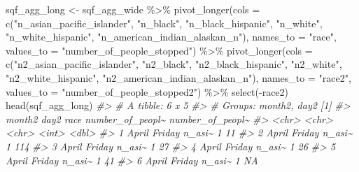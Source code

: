 \documentclass[
]{krantz}
\makeatletter
\newenvironment{Shaded}{\begin{snugshade}}{\end{snugshade}}
\newcommand{\AttributeTok}[1]{\textcolor[rgb]{0.61,0.61,0.61}{#1}}
\newcommand{\CommentTok}[1]{\textcolor[rgb]{0.37,0.37,0.37}{\textit{#1}}}
\newcommand{\FunctionTok}[1]{\textcolor[rgb]{0,0,0}{#1}}
\newcommand{\NormalTok}[1]{#1}
\newcommand{\OtherTok}[1]{\textcolor[rgb]{0.37,0.37,0.37}{#1}}
\newcommand{\SpecialCharTok}[1]{\textcolor[rgb]{0,0,0}{#1}}
\newcommand{\StringTok}[1]{\textcolor[rgb]{0.5,0.5,0.5}{#1}}
\newenvironment{kframe}{%
\medskip{}
\setlength{\fboxsep}{.8em}
 \def\at@end@of@kframe{}%
 \ifinner\ifhmode%
  \def\at@end@of@kframe{\end{minipage}}%
  \begin{minipage}{\columnwidth}%
 \fi\fi%
 \def\FrameCommand##1{\hskip\@totalleftmargin \hskip-\fboxsep
 \colorbox{shadecolor}{##1}\hskip-\fboxsep
     \hskip-\linewidth \hskip-\@totalleftmargin \hskip\columnwidth}%
 \MakeFramed {\advance\hsize-\width
   \@totalleftmargin\z@ \linewidth\hsize
   \@setminipage}}%
 {\par\unskip\endMakeFramed%
 \at@end@of@kframe}
\renewenvironment{Shaded}{\begin{kframe}}{\end{kframe}}
\makeatother
\begin{document}
\begin{Shaded}
\begin{Highlighting}[]
\NormalTok{sqf\_agg\_long }\OtherTok{\textless{}{-}}\NormalTok{ sqf\_agg\_wide }\SpecialCharTok{\%\textgreater{}\%}
  \FunctionTok{pivot\_longer}\NormalTok{(}\AttributeTok{cols =} \FunctionTok{c}\NormalTok{(}\StringTok{"n\_asian\_pacific\_islander"}\NormalTok{, }
                        \StringTok{"n\_black"}\NormalTok{,}
                        \StringTok{"n\_black\_hispanic"}\NormalTok{,}
                        \StringTok{"n\_white"}\NormalTok{,}
                        \StringTok{"n\_white\_hispanic"}\NormalTok{,}
                        \StringTok{"n\_american\_indian\_alaskan\_n"}\NormalTok{),}
               \AttributeTok{names\_to =} \StringTok{"race"}\NormalTok{,}
               \AttributeTok{values\_to =} \StringTok{"number\_of\_people\_stopped"}\NormalTok{) }\SpecialCharTok{\%\textgreater{}\%}
  \FunctionTok{pivot\_longer}\NormalTok{(}\AttributeTok{cols =} \FunctionTok{c}\NormalTok{(}\StringTok{"n2\_asian\_pacific\_islander"}\NormalTok{, }
                        \StringTok{"n2\_black"}\NormalTok{,}
                        \StringTok{"n2\_black\_hispanic"}\NormalTok{,}
                        \StringTok{"n2\_white"}\NormalTok{,}
                        \StringTok{"n2\_white\_hispanic"}\NormalTok{,}
                        \StringTok{"n2\_american\_indian\_alaskan\_n"}\NormalTok{),}
               \AttributeTok{names\_to =} \StringTok{"race2"}\NormalTok{,}
               \AttributeTok{values\_to =} \StringTok{"number\_of\_people\_stopped2"}\NormalTok{) }\SpecialCharTok{\%\textgreater{}\%}
  \FunctionTok{select}\NormalTok{(}\SpecialCharTok{{-}}\NormalTok{race2)}
\FunctionTok{head}\NormalTok{(sqf\_agg\_long)}
\CommentTok{\#\textgreater{} \# A tibble: 6 x 5}
\CommentTok{\#\textgreater{} \# Groups:   month2, day2 [1]}
\CommentTok{\#\textgreater{}   month2 day2   race   number\_of\_peopl\textasciitilde{} number\_of\_peopl\textasciitilde{}}
\CommentTok{\#\textgreater{}   \textless{}chr\textgreater{}  \textless{}chr\textgreater{}  \textless{}chr\textgreater{}             \textless{}int\textgreater{}            \textless{}dbl\textgreater{}}
\CommentTok{\#\textgreater{} 1 April  Friday n\_asi\textasciitilde{}                1               11}
\CommentTok{\#\textgreater{} 2 April  Friday n\_asi\textasciitilde{}                1              114}
\CommentTok{\#\textgreater{} 3 April  Friday n\_asi\textasciitilde{}                1               27}
\CommentTok{\#\textgreater{} 4 April  Friday n\_asi\textasciitilde{}                1               26}
\CommentTok{\#\textgreater{} 5 April  Friday n\_asi\textasciitilde{}                1               41}
\CommentTok{\#\textgreater{} 6 April  Friday n\_asi\textasciitilde{}                1               NA}
\end{Highlighting}
\end{Shaded}
\end{document}
